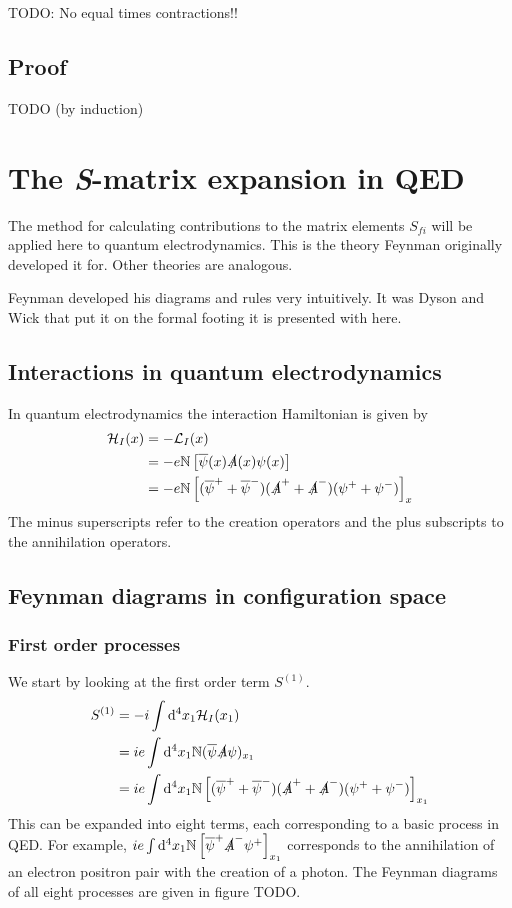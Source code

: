 TODO: No equal times contractions!!

\subsection{Proof}
TODO (by induction)

\section{The \textit{S}-matrix expansion in QED}
The method for calculating contributions to the matrix elements $S_{fi}$ will be applied here to quantum electrodynamics. This is the theory Feynman originally developed it for. Other theories are analogous.

Feynman developed his diagrams and rules very intuitively. It was Dyson and Wick that put it on the formal footing it is presented with here.

\subsection{Interactions in quantum electrodynamics}
In quantum electrodynamics the interaction Hamiltonian is given by
\begin{align*}
\mathcal{H}_I(x) &= -\mathcal{L} _I(x) \\
&= -e\mathbb{N}\left[\overline{\psi}(x)\slashed{A}(x)\psi(x)\right] \\
&= -e\mathbb{N}\left[(\overline{\psi}^+ + \overline{\psi}^-)(\slashed{A}^+ + \slashed{A}^-)(\psi^+ + \psi^-)\right]_x
\end{align*}
The minus superscripts refer to the creation operators and the plus subscripts to the annihilation operators.

\subsection{Feynman diagrams in configuration space}
\subsubsection{First order processes}
We start by looking at the first order term $S^{(1)}$.
\begin{align*}
S^{(1)} &= -i\int \operatorname{d \!}{^4 x_1}\mathcal{H}_I(x_1) \\
&= ie\int \operatorname{d \!}{^4x_1}\mathbb{N}(\overline{\psi}\slashed{A}\psi)_{x_1} \\
&= ie\int \operatorname{d \!}{^4x_1}\mathbb{N}\left[(\overline{\psi}^+ + \overline{\psi}^-)(\slashed{A}^+ + \slashed{A}^-)(\psi^+ + \psi^-)\right]_{x_1}
\end{align*}
This can be expanded into eight terms, each corresponding to a basic process in QED. For example, $ie\int \operatorname{d \!}{^4x_1}\mathbb{N}\left[\overline{\psi}^+\slashed{A}^-\psi^+\right]_{x_1}$ corresponds to the annihilation of an electron positron pair with the creation of a photon. The Feynman diagrams of all eight processes are given in figure TODO.

